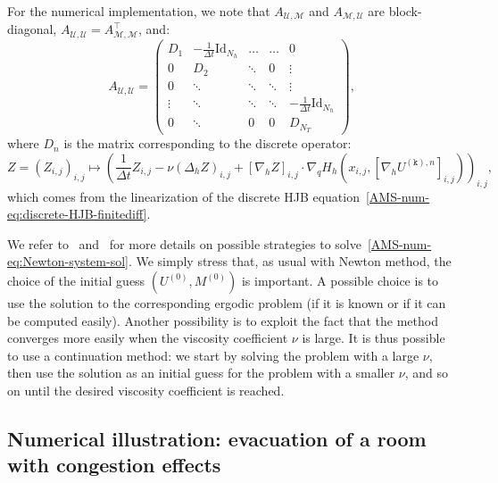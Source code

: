 \documentclass{amsproc}
\theoremstyle{definition}
\theoremstyle{remark}
\numberwithin{equation}{section}
\newcommand{\cM}{{\mathcal M}}
\newcommand{\cU}{{\mathcal U}}
\newcommand{\Id}{\mathrm{Id}}
\begin{document}
For the numerical implementation, we note that $A_{\cU, \cM}$ and $A_{\cM, \cU}$ are block-diagonal, $A_{\cU, \cU} = A_{\cM, \cM}^\top$, and:
$$
	A_{\cU, \cU}
	=
	\begin{pmatrix}
	D_1 & -\frac{1}{\Delta t}\Id_{N_h} & \dots & \dots & 0 
	\\
	0 & D_2 & \ddots & 0 & \vdots 
	\\
	0 & \ddots & \ddots & \ddots & \vdots
	\\
	\vdots & \ddots & \ddots & \ddots & -\frac{1}{\Delta t}\Id_{N_h}
	\\
	0 & \ddots & 0 & 0 & D_{N_T}
	\end{pmatrix},
$$
where $D_n$ is the matrix corresponding to the discrete operator:
$$
	Z = (Z_{i,j})_{i,j}
	\mapsto
	\left( \frac{1}{\Delta t} Z_{i,j} - \nu (\Delta_h Z)_{i,j} + [\nabla_h Z]_{i,j} \cdot \nabla_q H_h(x_{i,j}, [\nabla_h U^{(\mathtt{k}), n}]_{i,j})
	\right)_{i,j},
$$
which comes from the linearization of the discrete HJB equation~\eqref{AMS-num-eq:discrete-HJB-finitediff}. 

We refer to~\cite[Section 4]{MR3135339} and~\cite{MR2928376} for more details on possible strategies to solve~\eqref{AMS-num-eq:Newton-system-sol}. We simply stress that, as usual with Newton method, the choice of the initial guess $(U^{(0)}, M^{(0)})$ is important. A possible choice is to use the solution to the corresponding ergodic problem (if it is known or if it can be computed easily). Another possibility is to exploit the fact that the method converges more easily when the viscosity coefficient  $\nu$ is large. It is thus possible to use a continuation method: we start by solving the problem with a large $\nu$, then use the solution as an initial guess for the problem with a smaller $\nu$, and so on until the desired viscosity coefficient is reached.




\subsection{Numerical illustration: evacuation of a room with congestion effects}
\label{subsec:num-evacuation-crowd}
\end{document}
